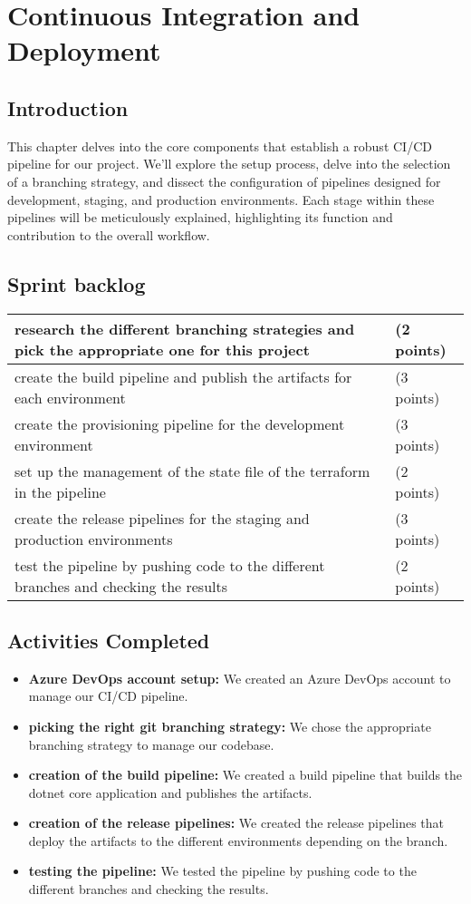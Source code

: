 \chapter{Continuous Integration and Deployment}

\section*{Introduction}
This chapter delves into the core components that establish a robust CI/CD pipeline for our project. We'll explore the setup process, delve into the selection of a branching strategy, and dissect the configuration of pipelines designed for development, staging, and production environments. Each stage within these pipelines will be meticulously explained, highlighting its function and contribution to the overall workflow.
\section{Sprint backlog}
\begin{longtable}[c]{
    |p{}|
    p{}|
    }
    \hline
    research the different branching strategies and pick the appropriate one for this project & (2 points) \\
    \hline
    create the build pipeline and publish the artifacts for each environment & (3 points) \\
    \hline
    create the provisioning pipeline for the development environment & (3 points) \\
    \hline
    set up the management of the state file of the terraform in the pipeline & (2 points) \\
    \hline
    create the release pipelines for the staging and production environments & (3 points) \\
    \hline
    test the pipeline by pushing code to the different branches and checking the results & (2 points) \\
    \hline
\end{longtable}
\section{Activities Completed}
\begin{itemize}
    \item \textbf{Azure DevOps account setup:} We created an Azure DevOps account to manage our CI/CD pipeline.
    \item \textbf{picking the right git branching strategy:} We chose the appropriate branching strategy to manage our codebase.
    \item \textbf{creation of the build pipeline:} We created a build pipeline that builds the dotnet core application and publishes the artifacts.
    \item \textbf{creation of the release pipelines:} We created the release pipelines that deploy the artifacts to the different environments depending on the branch.
    \item \textbf{testing the pipeline:} We tested the pipeline by pushing code to the different branches and checking the results.
\end{itemize}

